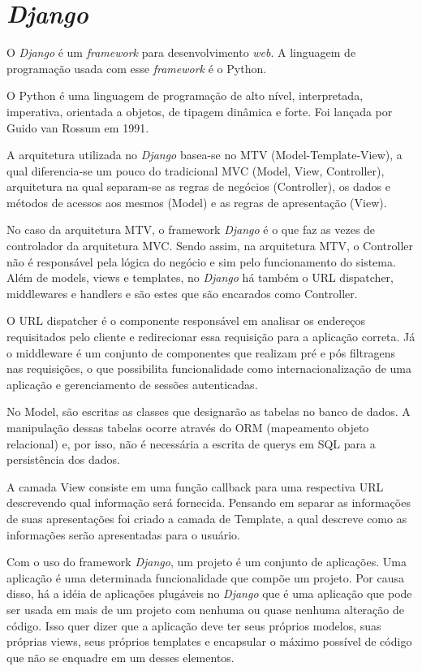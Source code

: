 \section{\textit{Django}}
O \textit{Django} é um \textit{framework} para desenvolvimento \textit{web}. A linguagem de programação usada com esse \textit{framework} é o Python.

O Python é uma linguagem de programação de alto nível, interpretada, imperativa, orientada a objetos, de tipagem dinâmica e forte. Foi lançada por Guido van Rossum em 1991.

A arquitetura utilizada no \textit{Django} basea-se no MTV (Model-Template-View), a qual diferencia-se um pouco do tradicional MVC (Model, View, Controller), arquitetura na qual separam-se as regras de negócios (Controller), os dados e métodos de acessos aos mesmos (Model) e as regras de apresentação (View).

No caso da arquitetura MTV, o framework \textit{Django} é o que faz as vezes de controlador da arquitetura MVC. Sendo assim, na arquitetura MTV, o Controller não é responsável pela lógica do negócio e sim pelo funcionamento do sistema. Além de models, views e templates, no \textit{Django} há também o URL dispatcher, middlewares e handlers e são estes que são encarados como Controller.

O URL dispatcher é o componente responsável em analisar os endereços requisitados pelo cliente e redirecionar essa requisição para a aplicação correta. Já o middleware é um conjunto de componentes que realizam pré e pós filtragens nas requisições, o que possibilita funcionalidade como internacionalização de uma aplicação e gerenciamento de sessões autenticadas.

No Model, são escritas as classes que designarão as tabelas no banco de dados. A manipulação dessas tabelas ocorre através do ORM (mapeamento objeto relacional) e, por isso, não é necessária a escrita de querys em SQL para a persistência dos dados.

A camada View consiste em uma função callback para uma respectiva URL descrevendo qual informação será fornecida. Pensando em separar as informações de suas apresentações foi criado a camada de Template, a qual descreve como as informações serão apresentadas para o usuário.

Com o uso do framework \textit{Django}, um projeto é um conjunto de aplicações. Uma aplicação é uma determinada funcionalidade que compõe um projeto. Por causa disso, há a idéia de aplicações plugáveis no \textit{Django} que é uma aplicação que pode ser usada em mais de um projeto com nenhuma ou quase nenhuma alteração de código. Isso quer dizer que a aplicação deve ter seus próprios modelos, suas próprias views, seus próprios templates e encapsular o máximo possível de código que não se enquadre em um desses elementos.

